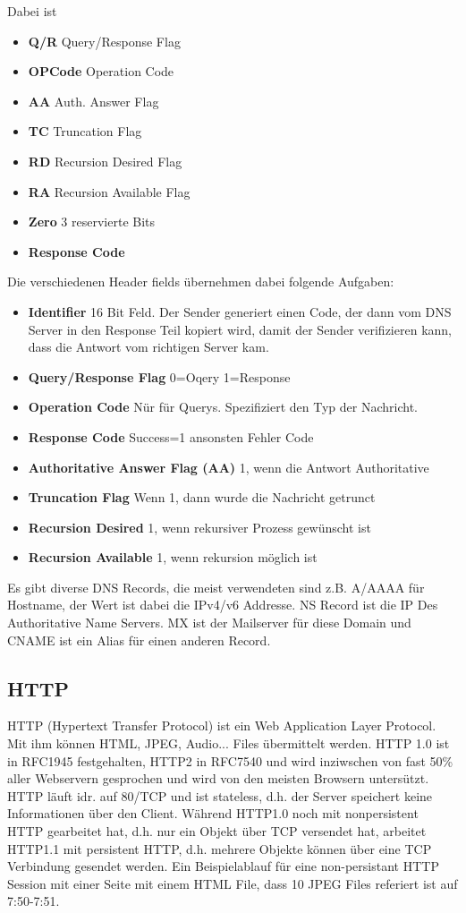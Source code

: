 			Dabei ist 
			\begin{itemize}
				\item \textbf{Q/R} Query/Response Flag
				\item \textbf{OPCode} Operation Code
				\item \textbf{AA} Auth. Answer Flag 
				\item \textbf{TC} Truncation Flag 
				\item \textbf{RD} Recursion Desired Flag 
				\item \textbf{RA} Recursion Available Flag 
				\item \textbf{Zero} 3 reservierte Bits 
				\item \textbf{Response Code} 
			\end{itemize}

			Die verschiedenen Header fields übernehmen dabei folgende Aufgaben:
			\begin{itemize}
				\item \textbf{Identifier} 16 Bit Feld. Der Sender generiert einen Code, der dann vom DNS Server in den Response Teil kopiert wird, damit der Sender verifizieren kann, dass die Antwort vom richtigen Server kam. 
				\item \textbf{Query/Response Flag} 0=Oqery 1=Response 
				\item \textbf{Operation Code} Nür für Querys. Spezifiziert den Typ der Nachricht. 
				\item \textbf{Response Code} Success=1 ansonsten Fehler Code
				\item \textbf{Authoritative Answer Flag (AA)} 1, wenn die Antwort Authoritative
				\item \textbf{Truncation Flag} Wenn 1, dann wurde die Nachricht getrunct
				\item \textbf{Recursion Desired} 1, wenn rekursiver Prozess gewünscht ist
				\item \textbf{Recursion Available} 1, wenn rekursion möglich ist
			\end{itemize}
			Es gibt diverse DNS Records, die meist verwendeten sind z.B. A/AAAA für Hostname, der Wert ist dabei die IPv4/v6 Addresse. NS Record ist die IP Des Authoritative Name Servers. MX ist der Mailserver für diese Domain und CNAME ist ein Alias für einen anderen Record. 

	\subsection{HTTP}
		HTTP (Hypertext Transfer Protocol) ist ein Web Application Layer Protocol. Mit ihm können HTML, JPEG, Audio... Files übermittelt werden. HTTP 1.0 ist in RFC1945 festgehalten, HTTP2 in RFC7540 und wird inziwschen von fast 50\% aller Webservern gesprochen und wird von den meisten Browsern untersützt. HTTP läuft idr. auf 80/TCP und ist stateless, d.h. der Server speichert keine Informationen über den Client. Während HTTP1.0 noch mit nonpersistent HTTP gearbeitet hat, d.h. nur ein Objekt über TCP versendet hat, arbeitet HTTP1.1 mit persistent HTTP, d.h. mehrere Objekte können über eine TCP Verbindung gesendet werden. Ein Beispielablauf für eine non-persistant HTTP Session mit einer Seite mit einem HTML File, dass 10 JPEG Files referiert ist auf 7:50-7:51.
		
